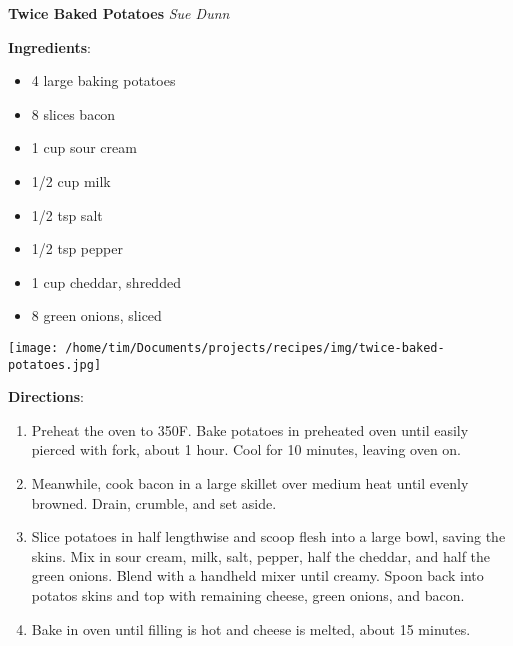 \documentclass[11pt, twoside, openany]{book}
\begin{document}
\noindent\begin{minipage}[t]{\linewidth}%
{\Large\textbf{Twice Baked Potatoes}} \label{twice-baked-potatoes}\hfill\textit{Sue Dunn}\\
\noindent\begin{minipage}[t]{0.78\linewidth}%
\textbf{Ingredients}:\vspace{-3mm}
\begin{multicols}{2}
\begin{itemize}\setlength\itemsep{-1mm}
\item 4 large baking potatoes
\item 8 slices bacon
\item 1 cup sour cream
\item 1/2 cup milk
\item 1/2 tsp salt
\item 1/2 tsp pepper
\item 1 cup cheddar, shredded
\item 8 green onions, sliced
\end{itemize}
\end{multicols}
\end{minipage}
\noindent\begin{minipage}[t]{0.18\linewidth}
\centering \strut\vspace*{-\baselineskip}\newline
\texttt{[image: /home/tim/Documents/projects/recipes/img/twice-baked-potatoes.jpg]}\\
\end{minipage}\vspace{3mm}
\textbf{Directions}:
\vspace{-3mm}\begin{enumerate}\setlength\itemsep{-1mm}
\item Preheat the oven to 350F. Bake potatoes in preheated oven until easily pierced with fork, about 1 hour. Cool for 10 minutes, leaving oven on.
\item Meanwhile, cook bacon in a large skillet over medium heat until evenly browned. Drain, crumble, and set aside.
\item Slice potatoes in half lengthwise and scoop flesh into a large bowl, saving the skins. Mix in sour cream, milk, salt, pepper, half the cheddar, and half the green onions. Blend with a handheld mixer until creamy. Spoon back into potatos skins and top with remaining cheese, green onions, and bacon.
\item Bake in oven until filling is hot and cheese is melted, about 15 minutes.
\end{enumerate}
\end{minipage}\vspace{8mm}
\end{document}
